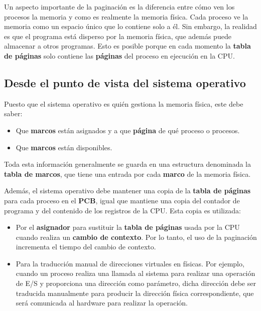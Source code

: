 Un aspecto importante de la paginación es la diferencia entre cómo ven
los procesos la memoria y como es realmente la memoria física. Cada
proceso ve la memoria como un espacio único que lo contiene solo a él.
Sin embargo, la realidad es que el programa está disperso por la memoria
física, que además puede almacenar a otros programas. Esto es posible
porque en cada momento la \textbf{tabla de páginas} solo contiene las
\textbf{páginas} del proceso en ejecución en la CPU.

\subsection{Desde el punto de vista del sistema
operativo}\label{_desde_el_punto_de_vista_del_sistema_operativo}

Puesto que el sistema operativo es quién gestiona la memoria física,
este debe saber:

\begin{itemize}
\item
  Que \textbf{marcos} están asignados y a que \textbf{página} de qué
  proceso o procesos.
\item
  Que \textbf{marcos} están disponibles.
\end{itemize}

Toda esta información generalmente se guarda en una estructura
denominada la \textbf{tabla de marcos}{}, que tiene una entrada por cada
\textbf{marco} de la memoria física.

Además, el sistema operativo debe mantener una copia de la \textbf{tabla
de páginas} para cada proceso en el \textbf{PCB}, igual que mantiene una
copia del contador de programa y del contenido de los registros de la
CPU. Esta copia es utilizada:

\begin{itemize}
\item
  Por el \textbf{asignador} para sustituir la \textbf{tabla de páginas}
  usada por la CPU cuando realiza un \textbf{cambio de contexto}. Por lo
  tanto, el uso de la paginación incrementa el tiempo del cambio de
  contexto.
\item
  Para la traducción manual de direcciones virtuales en físicas. Por
  ejemplo, cuando un proceso realiza una llamada al sistema para
  realizar una operación de E/S y proporciona una dirección como
  parámetro, dicha dirección debe ser traducida manualmente para
  producir la dirección física correspondiente, que será comunicada al
  hardware para realizar la operación.
\end{itemize}

